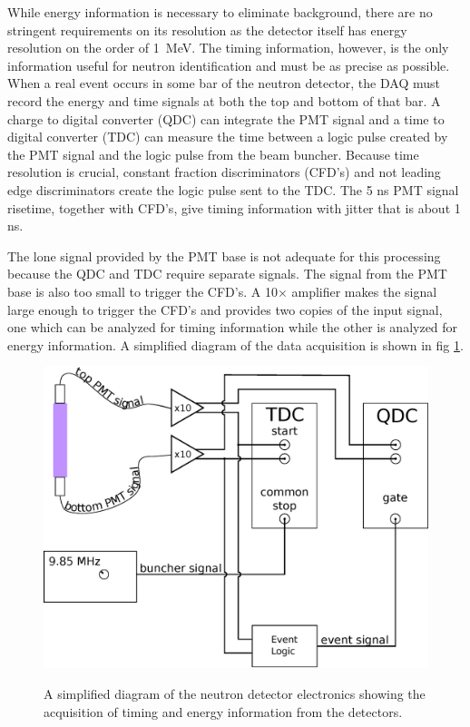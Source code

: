 While energy information is necessary to eliminate background, there are no stringent requirements on its resolution as the detector itself has energy resolution on the order of 1~MeV.  The timing information, however, is the only information useful for neutron identification and must be as precise as possible. When a real event occurs in some bar of the neutron detector, the DAQ must record the energy and time signals at both the top and bottom of that bar.  A charge to digital converter (QDC) can integrate the PMT signal and a time to digital converter (TDC) can measure the time between a logic pulse created by the PMT signal and the logic pulse from the beam buncher.  Because time resolution is crucial, constant fraction discriminators (CFD's) and not leading edge discriminators create the logic pulse sent to the TDC.  The 5 ns PMT signal risetime, together with CFD's, give timing information with jitter that is about 1 ns.  

The lone signal provided by the PMT base is not adequate for this processing because the QDC and TDC require separate signals.  The signal from the PMT base is also too small to trigger the CFD's.  A 10$\times$ amplifier makes the signal large enough to trigger the CFD's and provides two copies of the input signal, one which can be analyzed for timing information while the other is analyzed for energy information.  A simplified diagram of the data acquisition is shown in fig \ref{fig:simpleElectronics}.

\begin{figure}[htp]
\centering
\includegraphics[width=1.0\textwidth]{figures/basic_electronics.eps}
\label{fig:simpleElectronics}
\caption{A simplified diagram of the neutron detector electronics showing the acquisition of timing and energy information from the detectors.}
\end{figure}

